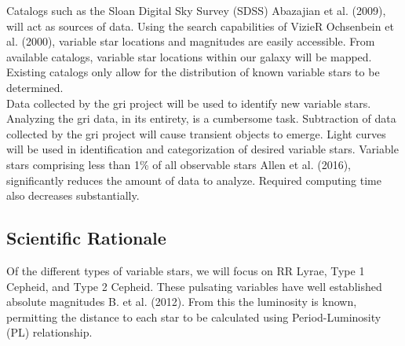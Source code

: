 \documentclass[letterpaper,11pt]{article}
\begin{document}
\noindent Catalogs such as the Sloan Digital Sky Survey (SDSS) Abazajian et al. (2009), will act as sources of data.  Using the search capabilities of VizieR Ochsenbein et al. (2000), variable star locations and magnitudes are easily accessible.  From available catalogs, variable star locations within our galaxy will be mapped.  Existing catalogs only allow for the distribution of known variable stars to be determined.\\



\noindent Data collected by the gri project will be used to identify new variable stars.
Analyzing the gri data, in its entirety, is a cumbersome task.  Subtraction of data collected by the gri project will cause transient objects to emerge.  
Light curves will be used in identification and categorization of desired variable stars.
Variable stars comprising less than 1\% of all observable stars Allen et al. (2016), significantly reduces the amount of data to analyze.  Required computing time also decreases substantially.


\subsection{Scientific Rationale}
Of the different types of variable stars, we will focus on RR Lyrae, Type 1 Cepheid, and Type 2 Cepheid.  These pulsating variables have well established absolute magnitudes B. et al. (2012).  From this the luminosity is known, permitting the distance to each star to be calculated using Period-Luminosity (PL) relationship.
\end{document}
